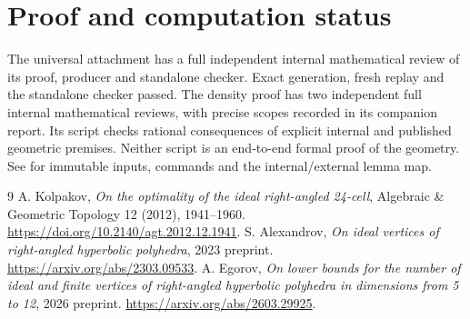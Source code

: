 \documentclass[11pt]{article}
\begin{document}
\section{Proof and computation status}
The universal attachment has a full independent internal mathematical
review of its proof, producer and standalone checker. Exact generation,
fresh replay and the standalone checker passed. The density proof has
two independent full internal mathematical reviews, with precise scopes
recorded in its companion report. Its script checks rational
consequences of explicit internal and published geometric premises.
Neither script is an end-to-end formal proof of the geometry.
See 
for immutable inputs, commands and the internal/external lemma map.

\begin{thebibliography}{9}
 A. Kolpakov, \emph{On the optimality of the ideal
right-angled 24-cell}, Algebraic \& Geometric Topology 12 (2012),
1941--1960. \url{https://doi.org/10.2140/agt.2012.12.1941}.
 S. Alexandrov, \emph{On ideal vertices of right-angled
hyperbolic polyhedra}, 2023 preprint.
\url{https://arxiv.org/abs/2303.09533}.
 A. Egorov, \emph{On lower bounds for the number of ideal
and finite vertices of right-angled hyperbolic polyhedra in dimensions
from 5 to 12}, 2026 preprint. \url{https://arxiv.org/abs/2603.29925}.
\end{thebibliography}
\end{document}
